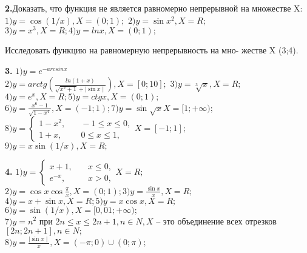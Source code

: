 \documentclass[12pt]{article}
\begin{document}
{\fontsize{18pt}{18pt}
\selectfont
\setlength{\parindent}{0.8cm}
\par \textbf{2.}Доказать, что функция не является равномерно непрерывной\linebreak
на множестве X:\\
\indent$1) y = \cos(1/x), X = (0;1);$ $2) y = \sin x^2, X = R;$\\
\indent$3) y = x^3, X = R; 4) y = ln x, X = (0;1);$ \\
\par Исследовать функцию на равномерную непрерывность на мно-\linebreak
жестве X (3;4).\\
\par \textbf{3.} $1) y = e^{-arcsin x}$\\
\indent$2) y = arctg (\frac{ln(1+x)}{\sqrt{x^2 + 1} + \mid \sin x \mid}), X = [0;10];$ $3) y = \sqrt[3]{x}, X = R;$\\
\indent$4) y = e^x, X = R; 5) y = ctg x, X = (0;1);$ \\
\indent$6) y = \frac{x^6 - 1}{\sqrt{1-x^4}}, X = (-1;1); 7) y = \sin \sqrt{x} X = [1;+\infty);$ \\
\indent$8) y =
  \begin{cases}
    1-x^2,       & \quad -1 \leq x \leq 0,\\
    1+x,  & \quad 0 \leq x \leq 1,
  \end{cases} X = [-1; 1];$\\
 \indent$ 9) y = x \sin (1/x), X = R;$\\
\par \textbf{4.} $1) y =
  \begin{cases}
    x+1,       & \quad x \leq 0,\\
    e^{-x},  & \quad x > 0,
  \end{cases} X = R;$\\
\indent$2) y = \cos x \cos{\frac{\pi}{x}}, X = (0;1); 3) y = \frac{\sin{x}}{x}, X = R;$ \\
\indent$4) y = x + \sin{x}, X = R; 5) y = x \cos{x}, X = R;$ \\
\indent$6) y = \sin(1/x), X = [0,01; +\infty);$\\
\indent$7) y = n^2$ при $2n \leq x \leq 2n + 1, n \in N, X$ -- это объединение всех\linebreak
отрезков $ [2n; 2n+1], n \in N;$\\
\indent$8) y = \frac{\mid \sin{x} \mid}{x}, X = (-\pi; 0) \cup (0;\pi);$\\

}
\end{document}
